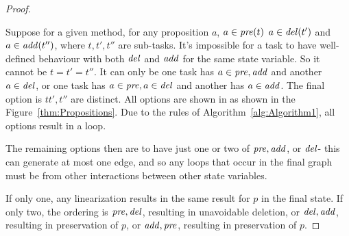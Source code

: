 \begin{proof}
\begin{figure}[h]
{\begin{subfigure}{6.5cm}
			\end{subfigure}	
		}
	\end{figure}
	
	Suppose for a given method, for any proposition $a$, $a \in \mathit{pre}(t)$ $a \in \mathit{del}(t')$ and $a \in \mathit{add}(t'')$, where $t, t', t''$ are sub-tasks. It's impossible for a task to have well-defined behaviour with both $\mathit{del}$ and $\mathit{add}$ for the same state variable. So it cannot be $t=t'=t''$. It can only be one task has $a \in \mathit{pre}, \mathit{add}$ and another $a \in \mathit{del}$, or one task has $a \in \mathit{pre}, a \in \mathit{del}$ and another has $a \in \mathit{add}$. The final option is $t t', t''$ are distinct. All options are shown in  as shown in the Figure~\ref{thm:Propositions}. Due to the rules of Algorithm~\ref{alg:Algorithm1}, all options result in a loop.	
	
	The remaining options then are to have just one or two of $\mathit{pre}, \mathit{add}$, or $\mathit{del}$- this can generate at most one edge, and so any loops that occur in the final graph must be from other interactions between other state variables.
	
	If only one, any linearization results in the same result for $p$ in the final state. If only two, the ordering is $\mathit{pre}, \mathit{del}$, resulting in unavoidable deletion, or $\mathit{del}, \mathit{add}$, resulting in preservation of $p$, or $\mathit{add}, \mathit{pre}$, resulting in preservation of $p$.
	
\end{proof}


